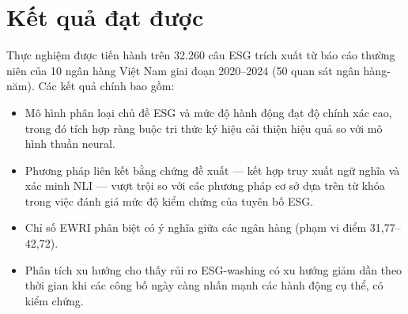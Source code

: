 \section{Kết quả đạt được}
Thực nghiệm được tiến hành trên 32.260 câu ESG trích xuất từ báo cáo thường niên của 10 ngân hàng Việt Nam giai đoạn 2020--2024 (50 quan sát ngân hàng-năm). Các kết quả chính bao gồm:
\begin{itemize}
    \item Mô hình phân loại chủ đề ESG và mức độ hành động đạt độ chính xác cao, trong đó tích hợp ràng buộc tri thức ký hiệu cải thiện hiệu quả so với mô hình thuần neural.
    \item Phương pháp liên kết bằng chứng đề xuất --- kết hợp truy xuất ngữ nghĩa và xác minh NLI --- vượt trội so với các phương pháp cơ sở dựa trên từ khóa trong việc đánh giá mức độ kiểm chứng của tuyên bố ESG.
    \item Chỉ số EWRI phân biệt có ý nghĩa giữa các ngân hàng (phạm vi điểm \mbox{31,77--42,72}).
    \item Phân tích xu hướng cho thấy rủi ro ESG-washing có xu hướng giảm dần theo thời gian khi các công bố ngày càng nhấn mạnh các hành động cụ thể, có kiểm chứng.
\end{itemize}





